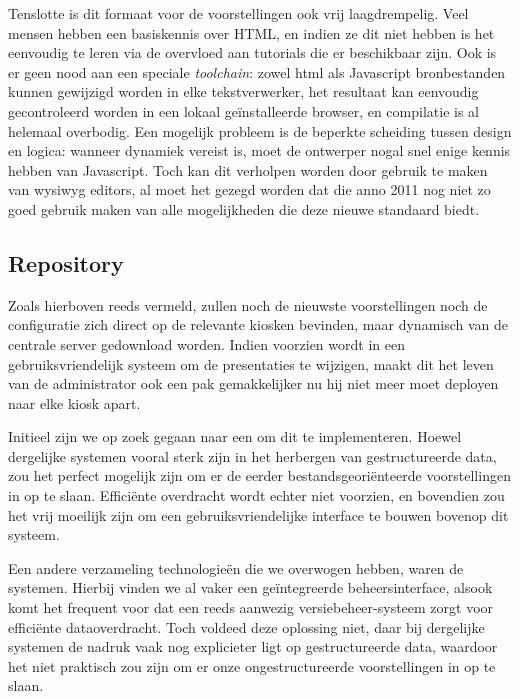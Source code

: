 \documentclass[verslag.tex]{subfiles}
\begin{document}
Tenslotte is dit formaat voor de voorstellingen ook vrij laagdrempelig. Veel mensen hebben een basiskennis over HTML, en indien ze dit niet hebben is het eenvoudig te leren via de overvloed aan tutorials die er beschikbaar zijn. Ook is er geen nood aan een speciale \emph{toolchain}: zowel \ac{html} als Javascript bronbestanden kunnen gewijzigd worden in elke tekstverwerker, het resultaat kan eenvoudig gecontroleerd worden in een lokaal geïnstalleerde browser, en compilatie is al helemaal overbodig.
Een mogelijk probleem is de beperkte scheiding tussen design en logica: wanneer dynamiek vereist is, moet de ontwerper nogal snel enige kennis hebben van Javascript. Toch kan dit verholpen worden door gebruik te maken van \ac{wysiwyg} editors, al moet het gezegd worden dat die anno 2011 nog niet zo goed gebruik maken van alle mogelijkheden die deze nieuwe standaard biedt.

\subsection{Repository}

Zoals hierboven reeds vermeld, zullen noch de nieuwste voorstellingen noch de configuratie zich direct op de relevante kiosken bevinden, maar dynamisch van de centrale server gedownload worden. Indien voorzien wordt in een gebruiksvriendelijk systeem om de presentaties te wijzigen, maakt dit het leven van de administrator ook een pak gemakkelijker nu hij niet meer moet deployen naar elke kiosk apart.

Initieel zijn we op zoek gegaan naar een  om dit te implementeren. Hoewel dergelijke systemen vooral sterk zijn in het herbergen van gestructureerde data, zou het perfect mogelijk zijn om er de eerder bestandsgeoriënteerde voorstellingen in op te slaan. Efficiënte overdracht wordt echter niet voorzien, en bovendien zou het vrij moeilijk zijn om een gebruiksvriendelijke interface te bouwen bovenop dit systeem.

Een andere verzameling technologieën die we overwogen hebben, waren de  systemen. Hierbij vinden we al vaker een geïntegreerde beheersinterface, alsook komt het frequent voor dat een reeds aanwezig versiebeheer-systeem zorgt voor efficiënte dataoverdracht. Toch voldeed deze oplossing niet, daar bij dergelijke systemen de nadruk vaak nog explicieter ligt op gestructureerde data, waardoor het niet praktisch zou zijn om er onze ongestructureerde voorstellingen in op te slaan.
\end{document}
